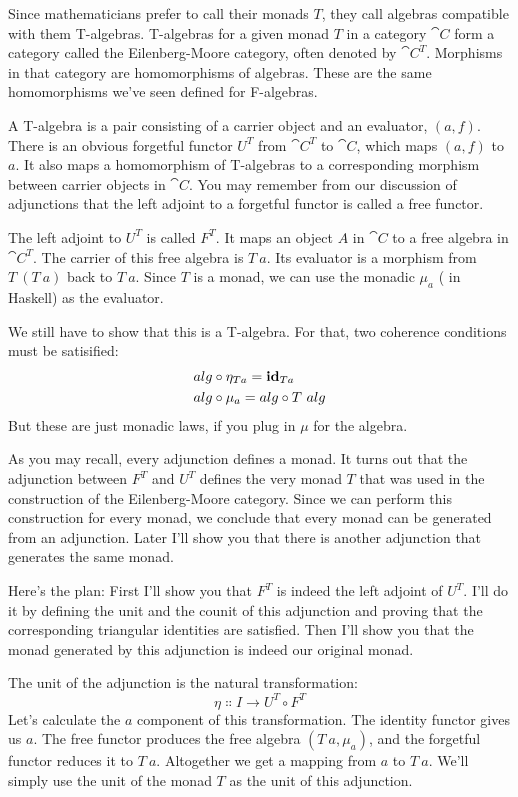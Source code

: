 Since mathematicians prefer to call their monads $T$, they call
algebras compatible with them T-algebras. T-algebras for a given monad $T$
in a category $\cat{C}$ form a category called the Eilenberg-Moore
category, often denoted by $\cat{C}^T$. Morphisms in that
category are homomorphisms of algebras. These are the same homomorphisms
we've seen defined for F-algebras.

A T-algebra is a pair consisting of a carrier object and an evaluator,
$(a, f)$. There is an obvious forgetful functor $U^T$ from
$\cat{C}^T$ to $\cat{C}$, which maps $(a, f)$ to $a$. It
also maps a homomorphism of T-algebras to a corresponding morphism
between carrier objects in $\cat{C}$. You may remember from our discussion of
adjunctions that the left adjoint to a forgetful functor is called a
free functor.

The left adjoint to $U^T$ is called $F^T$. It maps an object
$A$ in $\cat{C}$ to a free algebra in $\cat{C}^T$. The carrier
of this free algebra is $T\ a$. Its evaluator is a morphism from
$T\ (T\ a)$ back to $T\ a$. Since $T$ is a monad,
we can use the monadic $\mu_a$ ( in Haskell) as the
evaluator.

We still have to show that this is a T-algebra. For that, two coherence
conditions must be satisified:
\begin{align*}
alg &\circ \eta_{Ta} = \mathbf{id}_{Ta} \\
alg &\circ \mu_a = alg \circ T\ alg
\end{align*}
But these are just monadic laws, if you plug in $\mu$ for the
algebra.

As you may recall, every adjunction defines a monad. It turns out that
the adjunction between $F^T$ and $U^T$
defines the very monad $T$ that was used in the construction of
the Eilenberg-Moore category. Since we can perform this construction for
every monad, we conclude that every monad can be generated from an
adjunction. Later I'll show you that there is another adjunction that
generates the same monad.

Here's the plan: First I'll show you that $F^T$ is indeed the left
adjoint of $U^T$. I'll do it by defining the unit and the counit
of this adjunction and proving that the corresponding triangular
identities are satisfied. Then I'll show you that the monad generated by
this adjunction is indeed our original monad.

The unit of the adjunction is the natural transformation:
\[\eta \Colon I \to U^T \circ F^T\]
Let's calculate the $a$ component of this transformation. The
identity functor gives us $a$. The free functor produces the free
algebra $(T\ a, \mu_a)$, and the forgetful functor reduces it to
$T\ a$. Altogether we get a mapping from $a$ to
$T\ a$. We'll simply use the unit of the monad $T$ as the
unit of this adjunction.

